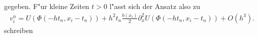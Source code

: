 gegeben. F"ur kleine Zeiten $t > 0$ l"asst sich der Ansatz also zu
\begin{align}\label{eq:3:reg:loesung}
v^n_i = U(\Phi(-h t_n, x_i- t_n)) + h^2 t_n \frac{b(x_i)}{2} \partial^2_x U(\Phi(-h t_n, x_i - t_n)) + O(h^3).
\end{align}
schreiben

